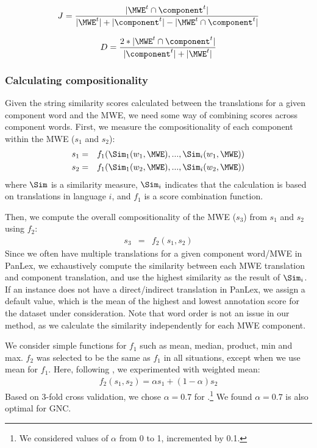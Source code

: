 \documentclass[output=paper
,modfonts
,nonflat]{langsci/langscibook}
\begin{document}
\begin{eqnarray*}
J = {{|\MWE^t \cap \component^t|}\over{|\MWE^t| + |\component^t| - |\MWE^t \cap \component^t|}}
\end{eqnarray*}


\begin{eqnarray*}
D = \frac{2*| \MWE^t \cap \component^t |}{|\component^t | + | \MWE^t |}
\end{eqnarray*}





\subsubsection{Calculating compositionality}
\label{sec:CM}

Given the string similarity scores calculated between the translations for a
given component word and the MWE, we need some way of combining scores
across component words. First, we measure the compositionality of each
component within the MWE ($s_1$ and $s_2$):
\begin{eqnarray*}
  s_1 &=& f_{1}(\Sim_{1}(w_{1},\MWE),...,\Sim_{i}(w_{1},\MWE))\\
  s_2 &=& f_{1}(\Sim_{1}(w_{2},\MWE),...,\Sim_{i}(w_{2},\MWE))
\end{eqnarray*}
where $\Sim$ is a similarity measure, $\Sim_{i}$ indicates that the
calculation is based on translations in language $i$, and $f_{1}$ is
a score combination function.

Then, we compute the overall compositionality of the MWE ($s_3$) from
$s_1$ and $s_2$ using $f_{2}$:
\begin{eqnarray*}
  s_3 &=& f_{2}(s_{1},s_{2})
\end{eqnarray*}
Since we often have multiple translations for a given component
word/MWE in PanLex, we exhaustively compute the similarity between
each MWE translation and component translation, and use the highest
similarity as the result of $\Sim_i$. If an instance does not have a
direct/indirect translation in PanLex, we assign a default value,
which is the mean of the highest and lowest annotation score for the
dataset under consideration. Note that word order is not an issue in
our method, as we calculate the similarity independently for each MWE
component.

We consider simple functions for $f_{1}$ such as mean, median,
product, min and max. $f_{2}$ was selected to be the same as $f_{1}$
in all situations, except when we use mean for $f_1$. Here, following
\citet{reddy2011a}, we experimented with weighted mean:
\begin{eqnarray*}
f_{2}(s_1,s_2) = \alpha s_1 + (1-\alpha) s_2 
\end{eqnarray*}
Based on 3-fold cross validation, we chose $\alpha = 0.7$ for
\REDDY.\footnote{We considered values of $\alpha$ from 0 to 1,
  incremented by 0.1.} We found $\alpha = 0.7$ is also optimal for GNC.
\end{document}
